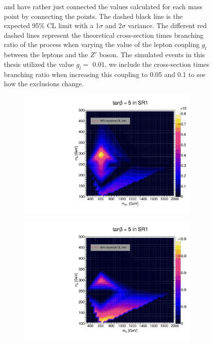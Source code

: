 \documentclass[12pt, a4paper]{book}
\begin{document}
\begin{figure}[!ht]
{   and have rather just connected the values calculated for each mass point by connecting the points. The dashed black line is the expected 95\% CL limit with a 1$\sigma$ and 2$\sigma$ variance. 
   The different red dashed lines represent the theoretical cross-section times branching ratio of the process when varying the value of the lepton coupling $g_l$ between the leptons and the $Z'$ boson. The simulated events in this thesis utilized the value $g_l=$ 0.01, we include the cross-section times branching ratio when increasing this coupling to 0.05 and 0.1 to see how the exclusions change.  }\label{fig:EFT_LDS_exclusion_ee_uu}
\end{figure}

\begin{figure}[!ht]
	\centering
	\begin{subfigure}[b]{0.49\textwidth}
      \centering
      \includegraphics[width=1\textwidth]{Limits/Model_independent/50-100/2HDM/2HDM_ee_tb5.pdf}
   \end{subfigure}
   \hfill
   \begin{subfigure}[b]{0.49\textwidth}
      \centering
      \includegraphics[width=1\textwidth]{Limits/Model_independent/50-100/2HDM/2HDM_uu_tb5.pdf}

\end{subfigure}
\end{figure}
\end{document}
